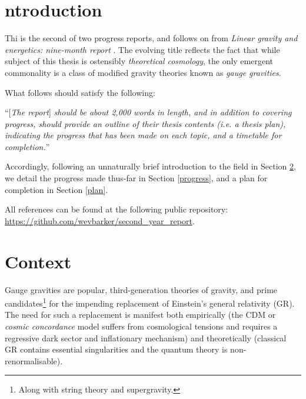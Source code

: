 \documentclass[twoside]{report}
\begin{document}
\date{\today}



\maketitle


\fi
\begin{multicols}{2}
\section{ntroduction}
Thi is the second of two progress reports, and follows on from \textit{Linear gravity and energetics: nine-month report} \cite{lg}. The evolving title reflects the fact that while subject of this thesis is ostensibly \textit{theoretical cosmology}, the only emergent commonality is a class of modified gravity theories known as \textit{gauge gravities}.

What follows should satisfy the following:

``[\textit{The report}] \textit{should be about 2,000 words in length, and in addition to covering progress, should provide an outline of their thesis contents (i.e. a thesis plan), indicating the progress that has been made on each topic, and a timetable for completion.}''

Accordingly, following an unnaturally brief introduction to the field in Section \ref{context}, we detail the progress made thus-far in Section \ref{progress}, and a plan for completion in Section \ref{plan}.

All references can be found at the following public repository: \url{https://github.com/wevbarker/second_year_report}.
\section{Context}\label{context}
Gauge gravities are popular, third-generation theories of gravity, and prime candidates\footnote{Along with string theory and supergravity.} for the impending replacement of Einstein's general relativity (GR). The need for such a replacement is manifest both empirically (the \textLambda CDM or \textit{cosmic concordance} model suffers from cosmological tensions and requires a regressive dark sector and inflationary mechanism) and theoretically (classical GR contains essential singularities and the quantum theory is non-renormalisable).


\end{multicols}
\end{document}

